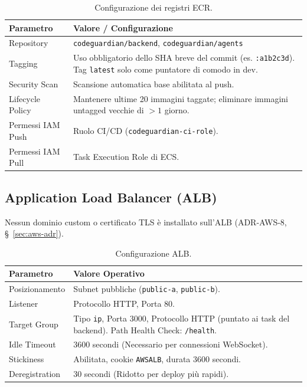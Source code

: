 \documentclass[11pt,a4paper]{article}
\begin{document}
\begin{table}[H]
\centering
\caption{Configurazione dei registri ECR.}
\label{tab:aws-ecr}
\vspace{2mm}
\renewcommand{\arraystretch}{1.2}
\begin{tabularx}{\textwidth}{|l|X|}
\hline
\textbf{Parametro} & \textbf{Valore / Configurazione} \\ \hline
Repository & \texttt{codeguardian/backend}, \texttt{codeguardian/agents} \\ \hline
Tagging & Uso obbligatorio dello SHA breve del commit (es. \texttt{:a1b2c3d}). Tag \texttt{latest} solo come puntatore di comodo in dev. \\ \hline
Security Scan & Scansione automatica base abilitata al push. \\ \hline
Lifecycle Policy & Mantenere ultime 20 immagini taggate; eliminare immagini untagged vecchie di $>1$ giorno. \\ \hline
Permessi IAM Push & Ruolo CI/CD (\texttt{codeguardian-ci-role}). \\ \hline
Permessi IAM Pull & Task Execution Role di ECS. \\ \hline
\end{tabularx}
\end{table}

\subsection{Application Load Balancer (ALB)}

Nessun dominio custom o certificato TLS è installato sull'ALB (ADR-AWS-8, \S~\ref{sec:aws-adr}).

\begin{table}[H]
\centering
\caption{Configurazione ALB.}
\label{tab:aws-alb}
\vspace{2mm}
\renewcommand{\arraystretch}{1.2}
\begin{tabularx}{\textwidth}{|l|X|}
\hline
\textbf{Parametro} & \textbf{Valore Operativo} \\ \hline
Posizionamento & Subnet pubbliche (\texttt{public-a}, \texttt{public-b}). \\ \hline
Listener & Protocollo HTTP, Porta 80. \\ \hline
Target Group & Tipo \texttt{ip}, Porta 3000, Protocollo HTTP (puntato ai task del backend). Path Health Check: \texttt{/health}. \\ \hline
Idle Timeout & 3600 secondi (Necessario per connessioni WebSocket). \\ \hline
Stickiness & Abilitata, cookie \texttt{AWSALB}, durata 3600 secondi. \\ \hline
Deregistration & 30 secondi (Ridotto per deploy più rapidi). \\ \hline
\end{tabularx}
\end{table}
\end{document}
